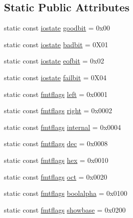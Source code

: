 \subsection*{Static Public Attributes}
\begin{DoxyCompactItemize}
\item 
static const \hyperlink{classios__base_a67209c853f091390e1a08ac0b043fe11}{iostate} \hyperlink{classios__base_ada0c8aa0797472d458523a3c2c475cdb}{goodbit} = 0x00
\item 
static const \hyperlink{classios__base_a67209c853f091390e1a08ac0b043fe11}{iostate} \hyperlink{classios__base_ae1ebed8197a63eab91d0077ced62879d}{badbit} = 0\-X01
\item 
static const \hyperlink{classios__base_a67209c853f091390e1a08ac0b043fe11}{iostate} \hyperlink{classios__base_a823ae086e75a9449cb485fbaaa47328f}{eofbit} = 0x02
\item 
static const \hyperlink{classios__base_a67209c853f091390e1a08ac0b043fe11}{iostate} \hyperlink{classios__base_ad4b89a6da8c3959a7efa16a5d05c211a}{failbit} = 0\-X04
\item 
static const \hyperlink{classios__base_a975a829c0b5d999dd5bce3758b59da10}{fmtflags} \hyperlink{classios__base_a3ab7a428d219e30dbd4d99d11bbb1a21}{left} = 0x0001
\item 
static const \hyperlink{classios__base_a975a829c0b5d999dd5bce3758b59da10}{fmtflags} \hyperlink{classios__base_a5192e88a82b9aefc8ae8f6d57ea4a720}{right} = 0x0002
\item 
static const \hyperlink{classios__base_a975a829c0b5d999dd5bce3758b59da10}{fmtflags} \hyperlink{classios__base_aea76c8967ab6a2be9edeefbdb2118e61}{internal} = 0x0004
\item 
static const \hyperlink{classios__base_a975a829c0b5d999dd5bce3758b59da10}{fmtflags} \hyperlink{classios__base_abb926294fefec12bd2215df50443d3ec}{dec} = 0x0008
\item 
static const \hyperlink{classios__base_a975a829c0b5d999dd5bce3758b59da10}{fmtflags} \hyperlink{classios__base_a14a0660d3467c093faf74d3876dccd78}{hex} = 0x0010
\item 
static const \hyperlink{classios__base_a975a829c0b5d999dd5bce3758b59da10}{fmtflags} \hyperlink{classios__base_a5448c9726ac797a737f548645317206f}{oct} = 0x0020
\item 
static const \hyperlink{classios__base_a975a829c0b5d999dd5bce3758b59da10}{fmtflags} \hyperlink{classios__base_ac49277b4c54fa854d90ef9a45ca9806d}{boolalpha} = 0x0100
\item 
static const \hyperlink{classios__base_a975a829c0b5d999dd5bce3758b59da10}{fmtflags} \hyperlink{classios__base_a1616f13bfc6964afc5ba93d78177dcf5}{showbase} = 0x0200

\end{DoxyCompactItemize}
